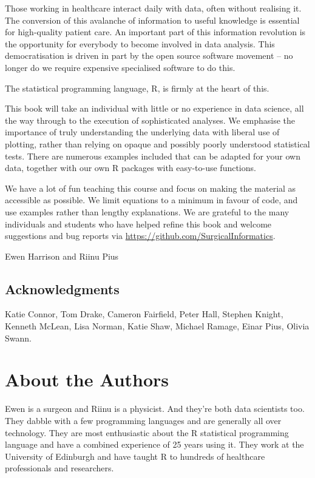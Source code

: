 \documentclass[
  12pt,
  krantz2]{krantz}
\begin{document}
Those working in healthcare interact daily with data, often without realising it.
The conversion of this avalanche of information to useful knowledge is essential for high-quality patient care.
An important part of this information revolution is the opportunity for everybody to become involved in data analysis.
This democratisation is driven in part by the open source software movement -- no longer do we require expensive specialised software to do this.

The statistical programming language, R, is firmly at the heart of this.

This book will take an individual with little or no experience in data science, all the way through to the execution of sophisticated analyses.
We emphasise the importance of truly understanding the underlying data with liberal use of plotting, rather than relying on opaque and possibly poorly understood statistical tests.
There are numerous examples included that can be adapted for your own data, together with our own R packages with easy-to-use functions.

We have a lot of fun teaching this course and focus on making the material as accessible as possible.
We limit equations to a minimum in favour of code, and use examples rather than lengthy explanations.
We are grateful to the many individuals and students who have helped refine this book and welcome suggestions and bug reports via \url{https://github.com/SurgicalInformatics}.

Ewen Harrison and Riinu Pius

\hypertarget{acknowledgments}{%
\section*{Acknowledgments}\label{acknowledgments}}


Katie Connor, Tom Drake, Cameron Fairfield, Peter Hall, Stephen Knight, Kenneth McLean, Lisa Norman, Katie Shaw, Michael Ramage, Einar Pius, Olivia Swann.

\hypertarget{about-the-authors}{%
\chapter*{About the Authors}\label{about-the-authors}}


Ewen is a surgeon and Riinu is a physicist.
And they're both data scientists too.
They dabble with a few programming languages and are generally all over technology.
They are most enthusiastic about the R statistical programming language and have a combined experience of 25 years using it.
They work at the University of Edinburgh and have taught R to hundreds of healthcare professionals and researchers.
\end{document}

